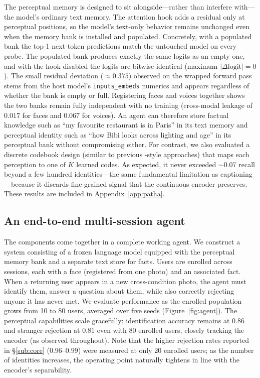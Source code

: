 The perceptual memory is designed to sit alongside---rather than interfere with---the model's ordinary text memory. The attention hook adds a residual only at perceptual positions, so the model's text-only behavior remains unchanged even when the memory bank is installed and populated. Concretely, with a populated bank the top-1 next-token predictions match the untouched model on every probe. The populated bank produces exactly the same logits as an empty one, and with the hook disabled the logits are bitwise identical (maximum $|\Delta\text{logit}| = 0$). The small residual deviation ($\approx 0.375$) observed on the wrapped forward pass stems from the host model's \texttt{inputs\_embeds} numerics and appears regardless of whether the bank is empty or full. Registering faces and voices together shows the two banks remain fully independent with no training (cross-modal leakage of $0.017$ for faces and $0.067$ for voices). An agent can therefore store factual knowledge such as ``my favourite restaurant is in Paris'' in its text memory and perceptual identity such as ``how Bibi looks across lighting and age'' in its perceptual bank without compromising either. For contrast, we also evaluated a discrete codebook design (similar to previous \patha{}-style approaches) that maps each perception to one of $K$ learned codes. As expected, it never exceeded $\sim$0.07 recall beyond a few hundred identities---the same fundamental limitation as captioning---because it discards fine-grained signal that the continuous encoder preserves. These results are included in Appendix~\ref{app:patha}.

\subsection{An end-to-end multi-session agent}
\label{sub:agent}

The components come together in a complete working agent. We construct a system consisting of a frozen language model equipped with the \attmem{} perceptual memory bank and a separate text store for facts. Users are enrolled across sessions, each with a face (registered from one photo) and an associated fact. When a returning user appears in a new cross-condition photo, the agent must identify them, answer a question about them, while also correctly rejecting anyone it has never met. We evaluate performance as the enrolled population grows from 10 to 80 users, averaged over five seeds (Figure~\ref{fig:agent}). The perceptual capabilities scale gracefully: identification accuracy remains at $0.86$ and stranger rejection at $0.81$ even with 80 enrolled users, closely tracking the encoder (as observed throughout). Note that the higher rejection rates reported in \S\ref{sub:core} ($0.96$--$0.99$) were measured at only 20 enrolled users; as the number of identities increases, the operating point naturally tightens in line with the encoder's separability.

